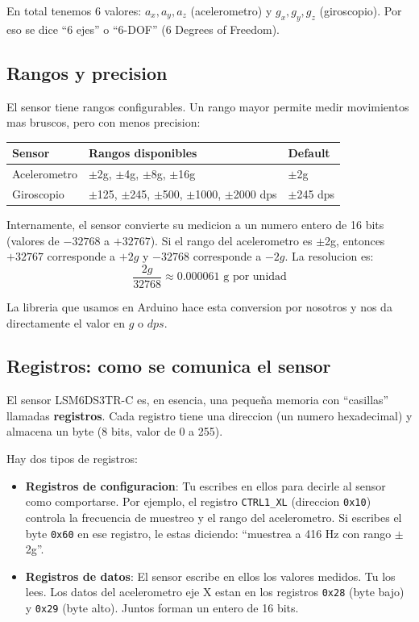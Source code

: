 \documentclass[11pt,a4paper]{article}
\begin{document}
En total tenemos 6 valores: $a_x, a_y, a_z$ (acelerometro) y
$g_x, g_y, g_z$ (giroscopio). Por eso se dice ``6 ejes'' o ``6-DOF''
(6 Degrees of Freedom).

\subsection{Rangos y precision}

El sensor tiene rangos configurables. Un rango mayor permite medir
movimientos mas bruscos, pero con menos precision:

\begin{center}
\begin{tabular}{lll}
\hline
\textbf{Sensor} & \textbf{Rangos disponibles} & \textbf{Default} \\
\hline
Acelerometro & $\pm$2g, $\pm$4g, $\pm$8g, $\pm$16g & $\pm$2g \\
Giroscopio & $\pm$125, $\pm$245, $\pm$500, $\pm$1000, $\pm$2000 dps & $\pm$245 dps \\
\hline
\end{tabular}
\end{center}

Internamente, el sensor convierte su medicion a un numero entero de
16 bits (valores de $-32768$ a $+32767$). Si el rango del
acelerometro es $\pm$2g, entonces $+32767$ corresponde a $+2g$ y
$-32768$ corresponde a $-2g$. La resolucion es:
$$\frac{2g}{32768} \approx 0.000061 \text{ g por unidad}$$

La libreria que usamos en Arduino hace esta conversion por nosotros
y nos da directamente el valor en $g$ o $dps$.

\subsection{Registros: como se comunica el sensor}

El sensor LSM6DS3TR-C es, en esencia, una pequeña memoria con
``casillas'' llamadas \textbf{registros}. Cada registro tiene una
direccion (un numero hexadecimal) y almacena un byte (8 bits,
valor de 0 a 255).

Hay dos tipos de registros:

\begin{itemize}
    \item \textbf{Registros de configuracion}: Tu escribes en ellos
          para decirle al sensor como comportarse. Por ejemplo, el
          registro \texttt{CTRL1\_XL} (direccion \texttt{0x10})
          controla la frecuencia de muestreo y el rango del
          acelerometro. Si escribes el byte \texttt{0x60} en ese
          registro, le estas diciendo: ``muestrea a 416 Hz con
          rango $\pm$2g''.

    \item \textbf{Registros de datos}: El sensor escribe en ellos
          los valores medidos. Tu los lees. Los datos del
          acelerometro eje X estan en los registros \texttt{0x28}
          (byte bajo) y \texttt{0x29} (byte alto). Juntos forman
          un entero de 16 bits.
\end{itemize}
\end{document}
